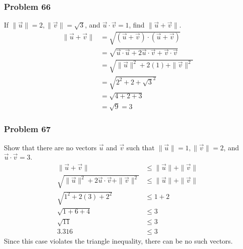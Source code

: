 \documentclass[letterpaper, 12pt]{math}
\begin{document}
\subsubsection*{Problem 66}
If \( \|\vec{u}\| = 2, \|\vec{v}\| = \sqrt{3} \), and \( \vec{u}\cdot\vec{v} =
1 \), find \( \|\vec{u}+\vec{v}\| \).
\begin{align*}
  \|\vec{u}+\vec{v}\| &= \sqrt{(\vec{u}+\vec{v})\cdot(\vec{u}+\vec{v})} \\
  &= \sqrt{\vec{u}\cdot\vec{u}+2\vec{u}\cdot\vec{v}+\vec{v}\cdot\vec{v}} \\
  &= \sqrt{\|\vec{u}\|^2+2(1)+\|\vec{v}\|^2} \\
  &= \sqrt{2^2+2+\sqrt{3}^2} \\
  &= \sqrt{4+2+3} \\
  &= \sqrt{9} = 3
\end{align*}

\subsubsection*{Problem 67}
Show that there are no vectors \( \vec{u} \) and \( \vec{v} \) such that
\( \|\vec{u}\| = 1, \|\vec{v}\| = 2 \), and \( \vec{u}\cdot\vec{v} = 3 \).
\begin{align*}
  \|\vec{u}+\vec{v}\| &\le \|\vec{u}\|+\|\vec{v}\| \\
  \sqrt{\|\vec{u}\|^2+2\vec{u}\cdot\vec{v}+\|\vec{v}\|^2} &\le
    \|\vec{u}\|+\|\vec{v}\| \\
  \sqrt{1^2+2(3)+2^2} &\le 1+2 \\
  \sqrt{1+6+4} &\le 3 \\
  \sqrt{11} &\le 3 \\
  3.316 &\le 3
\end{align*}
Since this case violates the triangle inequality, there can be no such vectors.
\end{document}
